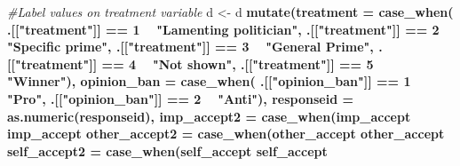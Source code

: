 \documentclass[
]{book}
\newenvironment{Shaded}{\begin{snugshade}}{\end{snugshade}}
\newcommand{\CommentTok}[1]{\textcolor[rgb]{0.56,0.35,0.01}{\textit{#1}}}
\newcommand{\DataTypeTok}[1]{\textcolor[rgb]{0.13,0.29,0.53}{#1}}
\newcommand{\DecValTok}[1]{\textcolor[rgb]{0.00,0.00,0.81}{#1}}
\newcommand{\KeywordTok}[1]{\textcolor[rgb]{0.13,0.29,0.53}{\textbf{#1}}}
\newcommand{\NormalTok}[1]{#1}
\newcommand{\OperatorTok}[1]{\textcolor[rgb]{0.81,0.36,0.00}{\textbf{#1}}}
\newcommand{\StringTok}[1]{\textcolor[rgb]{0.31,0.60,0.02}{#1}}
\begin{document}
\begin{Shaded}
\begin{Highlighting}[]
{{{{{{{\CommentTok{#Label values on treatment variable}
\NormalTok{d <-}\StringTok{ }\NormalTok{d }\OperatorTok{%>%}
\StringTok{  }\KeywordTok{mutate}\NormalTok{(}\DataTypeTok{treatment =} \KeywordTok{case_when}\NormalTok{(}
\NormalTok{    .[[}\StringTok{"treatment"}\NormalTok{]] }\OperatorTok{==}\StringTok{ }\DecValTok{1} \OperatorTok{~}\StringTok{ "Lamenting politician"}\NormalTok{,}
\NormalTok{    .[[}\StringTok{"treatment"}\NormalTok{]] }\OperatorTok{==}\StringTok{ }\DecValTok{2} \OperatorTok{~}\StringTok{ "Specific prime"}\NormalTok{,}
\NormalTok{    .[[}\StringTok{"treatment"}\NormalTok{]] }\OperatorTok{==}\StringTok{ }\DecValTok{3} \OperatorTok{~}\StringTok{ "General Prime"}\NormalTok{,}
\NormalTok{    .[[}\StringTok{"treatment"}\NormalTok{]] }\OperatorTok{==}\StringTok{ }\DecValTok{4} \OperatorTok{~}\StringTok{ "Not shown"}\NormalTok{,}
\NormalTok{    .[[}\StringTok{"treatment"}\NormalTok{]] }\OperatorTok{==}\StringTok{ }\DecValTok{5} \OperatorTok{~}\StringTok{ "Winner"}\NormalTok{),}
    \DataTypeTok{opinion_ban =} \KeywordTok{case_when}\NormalTok{(}
\NormalTok{    .[[}\StringTok{"opinion_ban"}\NormalTok{]] }\OperatorTok{==}\StringTok{ }\DecValTok{1} \OperatorTok{~}\StringTok{ "Pro"}\NormalTok{,}
\NormalTok{    .[[}\StringTok{"opinion_ban"}\NormalTok{]] }\OperatorTok{==}\StringTok{ }\DecValTok{2} \OperatorTok{~}\StringTok{ "Anti"}\NormalTok{),}
    \DataTypeTok{responseid =} \KeywordTok{as.numeric}\NormalTok{(responseid),}
         \DataTypeTok{imp_accept2 =} \KeywordTok{case_when}\NormalTok{(imp_accept }\OperatorTok{%in%}\StringTok{ }\DecValTok{4}\OperatorTok{:}\DecValTok{5} \OperatorTok{~}\StringTok{ "Important"}\NormalTok{,}
\NormalTok{                                imp_accept }\OperatorTok{%in%}\StringTok{ }\DecValTok{1}\OperatorTok{:}\DecValTok{3} \OperatorTok{~}\StringTok{ "Not important"}\NormalTok{),}
         \DataTypeTok{other_accept2 =} \KeywordTok{case_when}\NormalTok{(other_accept }\OperatorTok{%in%}\StringTok{ }\DecValTok{4}\OperatorTok{:}\DecValTok{5} \OperatorTok{~}\StringTok{ "High degree"}\NormalTok{,}
\NormalTok{                                  other_accept }\OperatorTok{%in%}\StringTok{ }\DecValTok{1}\OperatorTok{:}\DecValTok{3} \OperatorTok{~}\StringTok{ "Low degree"}\NormalTok{),}
         \DataTypeTok{self_accept2 =} \KeywordTok{case_when}\NormalTok{(self_accept }\OperatorTok{%in%}\StringTok{ }\DecValTok{4}\OperatorTok{:}\DecValTok{5} \OperatorTok{~}\StringTok{ "High degree"}\NormalTok{,}
\NormalTok{                                 self_accept }\OperatorTok{%in%}\StringTok{ }\DecValTok{1}\OperatorTok{:}\DecValTok{3} \OperatorTok{~}\StringTok{ "Low degree"}\NormalTok{),}
}}}}}}}}}}}}}}
\end{Highlighting}
\end{Shaded}
\end{document}
